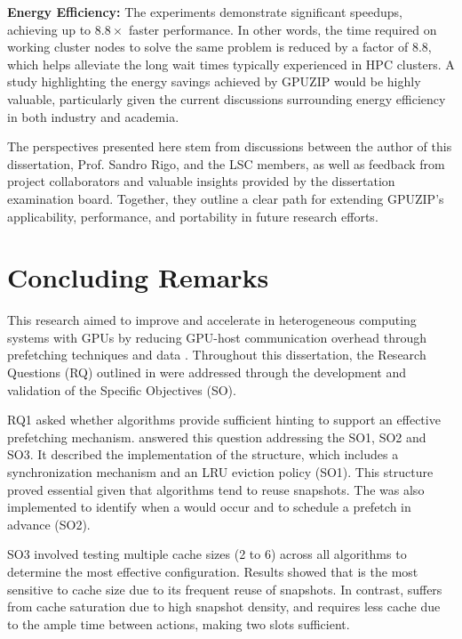 \documentclass[Ingles,Final]{ic-tese-v3}
\begin{document}
\textbf{Energy Efficiency:} The experiments demonstrate significant speedups, achieving up to $8.8\times$ faster performance. In other words, the time required on working cluster nodes to solve the same problem is reduced by a factor of $8.8$, which helps alleviate the long wait times typically experienced in HPC clusters. A study highlighting the energy savings achieved by GPUZIP would be highly valuable, particularly given the current discussions surrounding energy efficiency in both industry and academia.

The perspectives presented here stem from discussions between the author of this dissertation, Prof. Sandro Rigo, and the LSC members, as well as feedback from project collaborators and valuable insights provided by the dissertation examination board. Together, they outline a clear path for extending GPUZIP’s applicability, performance, and portability in future research efforts.

\section{Concluding Remarks}
\label{sec:conc}
This research aimed to improve and accelerate \checkpointing in heterogeneous computing systems with GPUs by reducing GPU-host communication overhead through prefetching techniques and data \compression. Throughout this dissertation, the Research Questions (RQ) outlined in  were addressed through the development and validation of the Specific Objectives (SO).

RQ1 asked whether \checkpointing algorithms provide sufficient hinting to support an effective prefetching mechanism.  answered this question addressing the SO1, SO2 and SO3. It described the implementation of the \cache structure, which includes a synchronization mechanism and an LRU eviction policy (SO1). This structure proved essential given that \checkpointing algorithms tend to reuse snapshots. The \psa was also implemented to identify when a  would occur and to schedule a prefetch in advance (SO2).

SO3 involved testing multiple cache sizes (2 to 6) across all \checkpointing algorithms to determine the most effective configuration. Results showed that \revolve is the most sensitive to cache size due to its frequent reuse of snapshots. In contrast, \zcut suffers from cache saturation due to high snapshot density, and \uniform requires less cache due to the ample time between \restore actions, making two slots sufficient.
\end{document}
